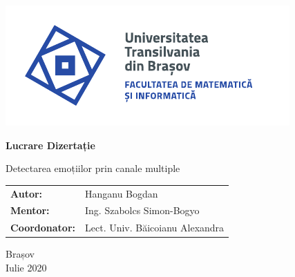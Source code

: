 \begin{titlepage}
	
	\vspace*{-3cm}
	\hspace{-2cm}
	\includegraphics[width=0.8\linewidth]{./images/Logo-UT-MI-SPOT-RO}
	
	\begin{center}
		\Huge
		
		\vspace{2cm}
		
		\textbf{Lucrare Dizertație}
		
		\vspace{1cm} 
		
		\LARGE Detectarea emoțiilor prin canale multiple
		
		\vfill
		
		\Large
		\begin{tabular}{ll}
			\textbf{Autor:}&Hanganu Bogdan\\
			\textbf{Mentor:}&Ing. Szabolcs Simon-Bogyo\\
			\textbf{Coordonator:}&Lect. Univ. Băicoianu Alexandra
		\end{tabular}
		
		\vfill
		
		\Large
		Brașov\\
		Iulie 2020
		
	\end{center}
\end{titlepage}